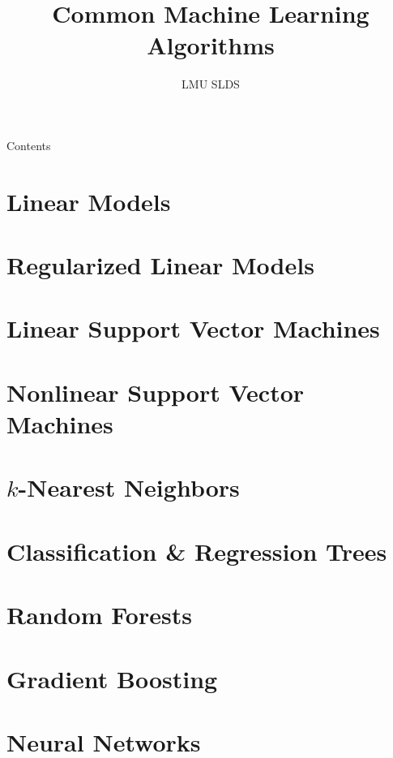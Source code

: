 



\title{Common Machine Learning Algorithms}
\author{LMU SLDS}
\date{}

\newcommand{\titlefigure}{figure/bagging.pdf}
\newcommand{\titlefiguresize}{0.6}







\lecturechapter{}

\begin{frame}{Contents}
  \tableofcontents
\end{frame}

\section{Linear Models}


\section{Regularized Linear Models}


\section{Linear Support Vector Machines}


\section{Nonlinear Support Vector Machines}


\section{$k$-Nearest Neighbors}


\section{Classification \& Regression Trees}


\section{Random Forests}


\section{Gradient Boosting}


\section{Neural Networks}


\endlecture

